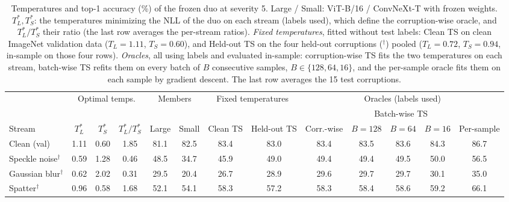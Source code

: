 \begin{table}[t]
    \centering
    \small
    \setlength{\tabcolsep}{4.5pt}
    \caption{Temperatures and top-1 accuracy (\%) of the frozen duo at severity 5. Large / Small: ViT-B/16 / ConvNeXt-T with frozen weights. $T_L^*, T_S^*$: the temperatures minimizing the NLL of the duo on each stream (labels used), which define the corruption-wise oracle, and $T_L^*/T_S^*$ their ratio (the last row averages the per-stream ratios). \emph{Fixed temperatures}, fitted without test labels: Clean TS on clean ImageNet validation data ($T_L = 1.11$, $T_S = 0.60$), and Held-out TS on the four held-out corruptions ($^\dagger$) pooled ($T_L = 0.72$, $T_S = 0.94$, in-sample on those four rows). \emph{Oracles}, all using labels and evaluated in-sample: corruption-wise TS fits the two temperatures on each stream, batch-wise TS refits them on every batch of $B$ consecutive samples, $B \in \{128, 64, 16\}$, and the per-sample oracle fits them on each sample by gradient descent. The last row averages the 15 test corruptions.}
    \label{tab:temperatures:frozen_bn__vitb16_convnextt}
    \label{tab:oracles:frozen_bn__vitb16_convnextt}
    \begin{tabular}{l|ccc|cc|cc|ccccc}
        \toprule
        & \multicolumn{3}{c|}{Optimal temps.} & \multicolumn{2}{c|}{Members} & \multicolumn{2}{c|}{Fixed temperatures} & \multicolumn{5}{c}{Oracles (labels used)} \\
         &  &  &  &  &  &  &  &  & \multicolumn{3}{c}{Batch-wise TS} &  \\
        \cmidrule(lr){10-12}
        Stream & $T_L^*$ & $T_S^*$ & $T_L^*/T_S^*$ & Large & Small & Clean TS & Held-out TS & Corr.-wise & $B{=}128$ & $B{=}64$ & $B{=}16$ & Per-sample \\
        \midrule
        Clean (val) & 1.11 & 0.60 & 1.85 & 81.1 & 82.5 & 83.4 & 83.0 & 83.4 & 83.5 & 83.6 & 84.3 & 86.7 \\
        \midrule
        Speckle noise$^\dagger$ & 0.59 & 1.28 & 0.46 & 48.5 & 34.7 & 45.9 & 49.0 & 49.4 & 49.4 & 49.5 & 50.0 & 56.5 \\
        Gaussian blur$^\dagger$ & 0.62 & 2.02 & 0.31 & 29.5 & 20.4 & 26.7 & 28.9 & 29.6 & 29.7 & 29.7 & 30.1 & 35.0 \\
        Spatter$^\dagger$ & 0.96 & 0.58 & 1.68 & 52.1 & 54.1 & 58.3 & 57.2 & 58.3 & 58.4 & 58.6 & 59.2 & 66.1 \\

\end{tabular}
\end{table}
